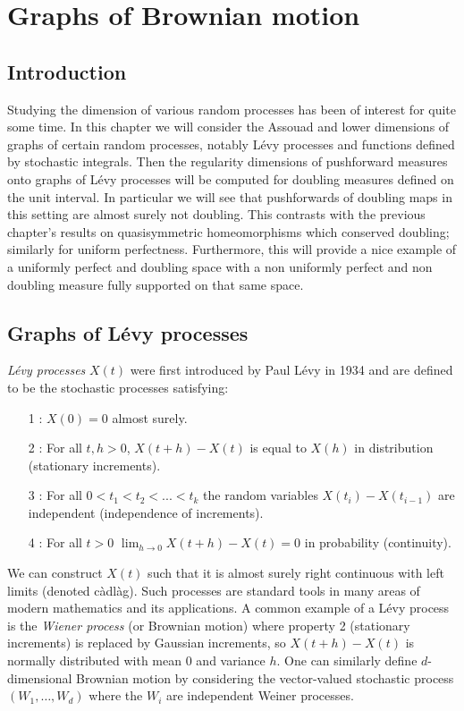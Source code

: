 \chapter{Graphs of Brownian motion}
\label{chap:graphs}

\section{Introduction}
\label{sec:intro-brownian}


Studying the dimension of various random processes has been of interest for quite some time. In this chapter we will consider the Assouad and lower dimensions of graphs of certain random processes, notably L\'evy processes and functions defined by stochastic integrals. Then the regularity dimensions of pushforward measures onto graphs of L\'evy processes will be computed for doubling measures defined on the unit interval. In particular we will see that pushforwards of doubling maps in this setting are almost surely not doubling. This contrasts with the previous chapter's results on quasisymmetric homeomorphisms which conserved doubling; similarly for uniform perfectness. Furthermore, this will provide a nice example of a uniformly perfect and doubling space with a non uniformly perfect and non doubling measure fully supported on that same space.


\section{Graphs of L\'evy processes}
\label{sec:levy-process}


\emph{L\'{e}vy processes} $X(t)$ were first introduced by Paul L\'evy in 1934 \cite{levy} and are defined to be the stochastic processes satisfying:
\begin{itemize}
	\item[1]: $X(0)=0$ almost surely.
	\item[2]: For all $t,h>0$, $X(t+h)-X(t)$ is equal to $X(h)$ in distribution (stationary increments).
	\item[3]: For all $0<t_1<t_2<...<t_k$ the random variables $X(t_i)-X(t_{i-1})$ are independent (independence of increments).
	\item[4]: For all $t>0$ $\lim_{h\to 0} X(t+h)-X(t)=0$ in probability (continuity).
\end{itemize}

We can construct $X(t)$ such that it is almost surely right continuous with left limits (denoted c\`adl\`ag). Such processes are standard tools in many areas of modern mathematics and its applications. A common example of a L\'evy process is the \emph{Wiener process} (or Brownian motion) where property 2 (stationary increments) is replaced by Gaussian increments, so $X(t+h)-X(t)$ is normally distributed with mean 0 and variance $h$. One can similarly define $d$-dimensional Brownian motion by considering the vector-valued stochastic process $(W_1,\ldots, W_d)$ where the $W_i$ are independent Weiner processes. 


